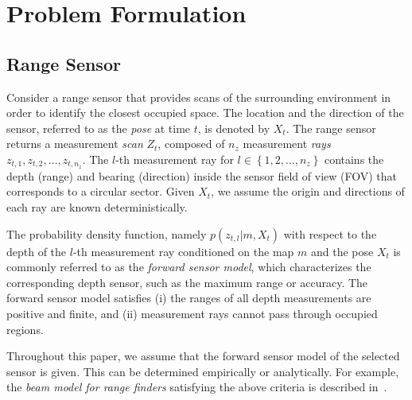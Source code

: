 \documentclass[letterpaper, 10pt, conference]{ieeeconf}
\newcommand{\braces}[1]{\ensuremath{\left\{ #1 \right\}}}
\begin{document}
\section{Problem Formulation}
\label{sec:ProbForm}

\subsection{Range Sensor}

Consider a range sensor that provides scans of the surrounding environment in order to identify the closest occupied space. The location and the direction of the sensor, referred to as the \emph{pose} at time $t$, is denoted by $X_t$. The range sensor returns a measurement \emph{scan} $Z_t$, composed of $n_z$ measurement \emph{rays} $z_{t,1},z_{t,2},\ldots,z_{t,n_z}$. The $l$-th measurement ray for $l\in\braces{1,2,\ldots,n_z}$ contains the depth (range) and bearing (direction) inside the sensor field of view (FOV) that corresponds to a circular sector. Given $X_t$, we assume the origin and directions of each ray are known deterministically.

The probability density function, namely $p(z_{t,l}|m,X_t)$ with respect to the depth of the $l$-th measurement ray conditioned on the map $m$ and the pose $X_t$ is commonly referred to as the \emph{forward sensor model}, which characterizes the corresponding depth sensor, such as the maximum range or accuracy. The forward sensor model satisfies  (i) the ranges of all depth measurements are positive and finite, and (ii) measurement rays cannot pass through occupied regions.

Throughout this paper, we assume that the forward sensor model of the selected sensor is given. This can be determined empirically or analytically. For example, the \emph{beam model for range finders} satisfying  the above criteria is described in~\cite{ThrBurFox05}.
\end{document}
